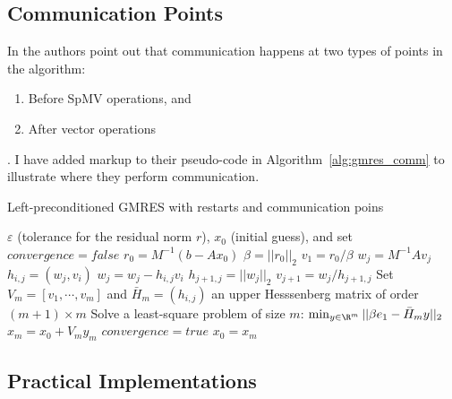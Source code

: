 \subsection{Communication Points} 

In \cite{Bahi2011} the authors point out that communication happens at two types of points in the algorithm: \begin{enumerate} \item Before SpMV operations, and \item After vector operations \end{enumerate}. I have added markup to their pseudo-code in Algorithm~\ref{alg:gmres_comm} to illustrate where they perform communication. 

\begin{algorithm}                      %
\caption{Left-preconditioned GMRES with restarts and {\color{red} communication poins} }          %
\label{alg:gmres_comm}                           %
\begin{algorithmic}[1]                   %
    \State $\varepsilon$ (tolerance for the residual norm $r$), $x_0$ (initial guess), and set $convergence = false$
    \State $r_0 = M^{-1} (b-Ax_0)$ 	
    \State $\beta = ||r_0||_2$		
    \State $v_1 = r_0 / \beta$
			\State $w_j = M^{-1} A v_j$			 	
				\State $h_{i,j} = (w_j, v_i)$ 				
				\State $w_j = w_j - h_{i,j} v_i$
			\EndFor 
			\State $h_{j+1, j}  = ||w_j||_2$			
			\State $v_{j+1} = w_j / h_{j+1,j}$	
	\EndFor
	\State Set $V_m = [v_1, \cdots, v_m]$ and $\bar{H}_m = (h_{i,j})$ an upper Hesssenberg matrix of order $(m+1)\times m$
	\State Solve a least-square problem of size $m$: $\min_{y \in \R^m} ||\beta e_1 - \bar{H}_m y||_2$
	\State $x_m = x_0 + V_m y_m$
		\State $convergence = true$
	\EndIf
	\State $x_0 = x_m$
    \EndWhile
\end{algorithmic}
\end{algorithm}

\subsection{Practical Implementations}

